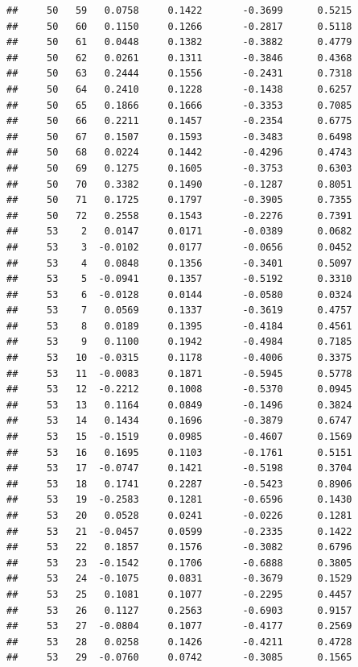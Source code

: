 \documentclass[
]{article}
\begin{document}
\begin{verbatim}
##     50   59   0.0758     0.1422       -0.3699      0.5215  
##     50   60   0.1150     0.1266       -0.2817      0.5118  
##     50   61   0.0448     0.1382       -0.3882      0.4779  
##     50   62   0.0261     0.1311       -0.3846      0.4368  
##     50   63   0.2444     0.1556       -0.2431      0.7318  
##     50   64   0.2410     0.1228       -0.1438      0.6257  
##     50   65   0.1866     0.1666       -0.3353      0.7085  
##     50   66   0.2211     0.1457       -0.2354      0.6775  
##     50   67   0.1507     0.1593       -0.3483      0.6498  
##     50   68   0.0224     0.1442       -0.4296      0.4743  
##     50   69   0.1275     0.1605       -0.3753      0.6303  
##     50   70   0.3382     0.1490       -0.1287      0.8051  
##     50   71   0.1725     0.1797       -0.3905      0.7355  
##     50   72   0.2558     0.1543       -0.2276      0.7391  
##     53    2   0.0147     0.0171       -0.0389      0.0682  
##     53    3  -0.0102     0.0177       -0.0656      0.0452  
##     53    4   0.0848     0.1356       -0.3401      0.5097  
##     53    5  -0.0941     0.1357       -0.5192      0.3310  
##     53    6  -0.0128     0.0144       -0.0580      0.0324  
##     53    7   0.0569     0.1337       -0.3619      0.4757  
##     53    8   0.0189     0.1395       -0.4184      0.4561  
##     53    9   0.1100     0.1942       -0.4984      0.7185  
##     53   10  -0.0315     0.1178       -0.4006      0.3375  
##     53   11  -0.0083     0.1871       -0.5945      0.5778  
##     53   12  -0.2212     0.1008       -0.5370      0.0945  
##     53   13   0.1164     0.0849       -0.1496      0.3824  
##     53   14   0.1434     0.1696       -0.3879      0.6747  
##     53   15  -0.1519     0.0985       -0.4607      0.1569  
##     53   16   0.1695     0.1103       -0.1761      0.5151  
##     53   17  -0.0747     0.1421       -0.5198      0.3704  
##     53   18   0.1741     0.2287       -0.5423      0.8906  
##     53   19  -0.2583     0.1281       -0.6596      0.1430  
##     53   20   0.0528     0.0241       -0.0226      0.1281  
##     53   21  -0.0457     0.0599       -0.2335      0.1422  
##     53   22   0.1857     0.1576       -0.3082      0.6796  
##     53   23  -0.1542     0.1706       -0.6888      0.3805  
##     53   24  -0.1075     0.0831       -0.3679      0.1529  
##     53   25   0.1081     0.1077       -0.2295      0.4457  
##     53   26   0.1127     0.2563       -0.6903      0.9157  
##     53   27  -0.0804     0.1077       -0.4177      0.2569  
##     53   28   0.0258     0.1426       -0.4211      0.4728  
##     53   29  -0.0760     0.0742       -0.3085      0.1565  

\end{verbatim}
\end{document}
